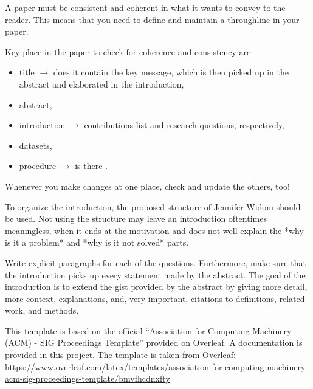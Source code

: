 \documentclass[manuscript, nonacm]{acmart}
\begin{document}
\begin{tcolorbox}[title=Have a throughline in your paper and maintain it!,colback=red!20]
    A paper must be consistent and coherent in what it wants to convey to the reader.
    This means that you need to define and maintain a throughline in your paper.

    Key place in the paper to check for coherence and consistency are
    \begin{itemize}
        \item title $\rightarrow$ does it contain the key message, which is then picked up in the abstract and elaborated in the introduction, 
        \item abstract, 
        \item introduction $\rightarrow$ contributions list and research questions, respectively, 
        \item datasets,
        \item procedure $\rightarrow$ is there .
    \end{itemize}


    Whenever you make changes at one place, check and update the others, too!
\end{tcolorbox}


\begin{tcolorbox}[title=Instructions: Write following this structure.]

To organize the introduction, the proposed structure of Jennifer Widom should be used. 
Not using the structure may leave an introduction oftentimes meaningless, when it ends at the motivation and does not well explain the *why is it a problem* and *why is it not solved* parts.

Write explicit paragraphs for each of the questions. 
Furthermore, make sure that the introduction picks up every statement made by the abstract.
The goal of the introduction is to extend the gist provided by the abstract by giving more detail, more context, explanations, and, very important, citations to definitions, related work, and methods.
\end{tcolorbox}

This template is based on the official ``Association for Computing Machinery (ACM) - SIG Proceedings Template'' provided on Overleaf. A documentation is provided in this project. The template is taken from Overleaf:
\url{https://www.overleaf.com/latex/templates/association-for-computing-machinery-acm-sig-proceedings-template/bmvfhcdnxfty}

\end{document}

